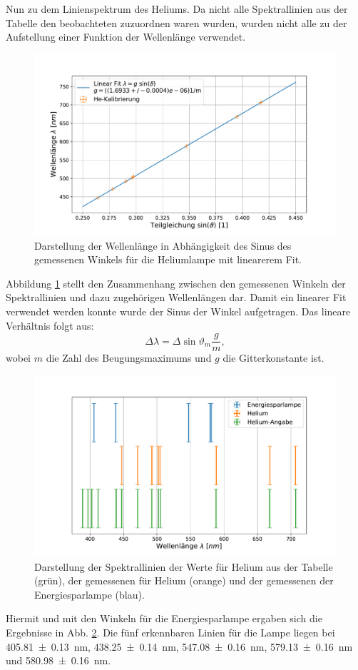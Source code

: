 	Nun zu dem Linienspektrum des Heliums.
	Da nicht alle Spektrallinien aus der Tabelle den beobachteten zuzuordnen waren wurden, wurden nicht alle zu der Aufstellung einer Funktion der Wellenlänge verwendet.
	\begin{figure}[ht]
		\centering
		\includegraphics[width=\textwidth]{data/GitterConstPruef.pdf}
		\caption{Darstellung der Wellenlänge in Abhängigkeit des Sinus des gemessenen Winkels für die Heliumlampe mit linearerem Fit.}
		\label{fig:Funktion}	
	\end{figure}
	Abbildung \ref{fig:Funktion} stellt den Zusammenhang zwischen den gemessenen Winkeln der Spektrallinien und dazu zugehörigen Wellenlängen dar.
	Damit ein linearer Fit verwendet werden konnte wurde der Sinus der Winkel aufgetragen.
	Das lineare Verhältnis folgt aus:
	\begin{equation} \label{eq:linear}
		\Delta\lambda = \Delta\sin{\vartheta_m} \frac{g}{m},
	\end{equation}
	wobei $m$ die Zahl des Beugungsmaximums	und $g$ die Gitterkonstante ist.
	\begin{figure}[ht]
		\centering
		\includegraphics[width=\textwidth]{data/EnergieSpar.pdf}
		\caption{Darstellung der Spektrallinien der Werte für Helium aus der Tabelle (grün), der gemessenen für Helium (orange) und der gemessenen der Energiesparlampe (blau).}
		\label{fig:Linien}	
	\end{figure}
	Hiermit und mit den Winkeln für die Energiesparlampe ergaben sich die Ergebnisse in Abb. \ref{fig:Linien}.
	Die fünf erkennbaren Linien für die Lampe liegen bei \SI{405.81+-0.13}{\nano\meter}, \SI{438.25+-0.14}{\nano\meter}, \SI{547.08+-0.16}{\nano\meter}, \SI{579.13+-0.16}{\nano\meter} und \SI{580.98+-0.16}{\nano\meter}.
	

